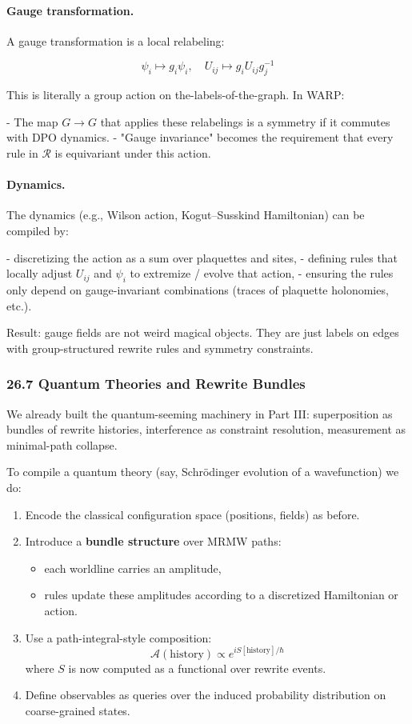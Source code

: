 \paragraph{Gauge transformation.}

A gauge transformation is a local relabeling:

\[
  \psi_i \mapsto g_i \psi_i, \quad
  U_{ij} \mapsto g_i U_{ij} g_j^{-1}
\]

This is literally a group action on the-labels-of-the-graph. In WARP:

- The map $G \to G$ that applies these relabelings is a symmetry if it commutes with DPO dynamics.
- "Gauge invariance" becomes the requirement that every rule in $\mathcal{R}$ is equivariant under this action.

\paragraph{Dynamics.}

The dynamics (e.g., Wilson action, Kogut–Susskind Hamiltonian) can be compiled by:

- discretizing the action as a sum over plaquettes and sites,
- defining rules that locally adjust $U_{ij}$ and $\psi_i$ to extremize / evolve that action,
- ensuring the rules only depend on gauge-invariant combinations (traces of plaquette holonomies, etc.).

Result: gauge fields are not weird magical objects. They are just labels on edges with group-structured rewrite rules and symmetry constraints.

\subsubsection*{26.7  Quantum Theories and Rewrite Bundles}

We already built the quantum-seeming machinery in Part III: superposition as bundles of rewrite histories, interference as constraint resolution, measurement as minimal-path collapse.

To compile a quantum theory (say, Schrödinger evolution of a wavefunction) we do:

\begin{enumerate}
  \item Encode the classical configuration space (positions, fields) as before.
  \item Introduce a \textbf{bundle structure} over MRMW paths:
    \begin{itemize}
      \item each worldline carries an amplitude,
      \item rules update these amplitudes according to a discretized Hamiltonian or action.
    \end{itemize}
  \item Use a path-integral-style composition:
    \[
      \mathcal{A}(\text{history}) \propto e^{i S[\text{history}]/\hbar}
    \]
    where $S$ is now computed as a functional over rewrite events.
  \item Define observables as queries over the induced probability distribution on coarse-grained states.
\end{enumerate}


